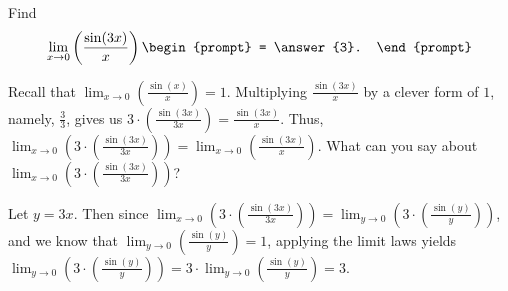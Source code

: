 \documentclass{ximera}
\author{Gregory Hartman \and Matthew Carr}
\begin{document}
\begin{exercise}




Find 
\[
\lim_{x\to0}\left({\frac{\sin(3x)}{x}}\right)
\begin{prompt}
= \answer{3}.
\end{prompt}
\]

\begin{hint}
Recall that $\lim_{x\to0}\left({\frac{\sin(x)}{x}}\right)=1$. Multiplying $\frac{\sin(3x)}{x}$ by a clever form of $1$, namely, $\frac{3}{3}$, gives us $3\cdot\left({\frac{\sin(3x)}{3x}}\right)=\frac{\sin(3x)}{x}$. Thus, $\lim_{x\to0}\left({3\cdot\left({\frac{\sin(3x)}{3x}}\right)}\right)=\lim_{x\to0}\left({\frac{\sin(3x)}{x}}\right)$. What can you say about $\lim_{x\to0}\left({3\cdot\left({\frac{\sin(3x)}{3x}}\right)}\right)$?
\end{hint}
\begin{hint}
Let $y=3x$. Then since $\lim_{x\to0}\left({3\cdot\left({\frac{\sin(3x)}{3x}}\right)}\right)=\lim_{y\to0}\left({3\cdot\left({\frac{\sin(y)}{y}}\right)}\right)$, and we know that $\lim_{y\to0}\left({\frac{\sin(y)}{y}}\right)=1$, applying the limit laws yields $\lim_{y\to0}\left({3\cdot\left({\frac{\sin(y)}{y}}\right)}\right)=3\cdot\lim_{y\to0}\left({\frac{\sin(y)}{y}}\right)=3$.
\end{hint}

\end{exercise}
\end{document}
